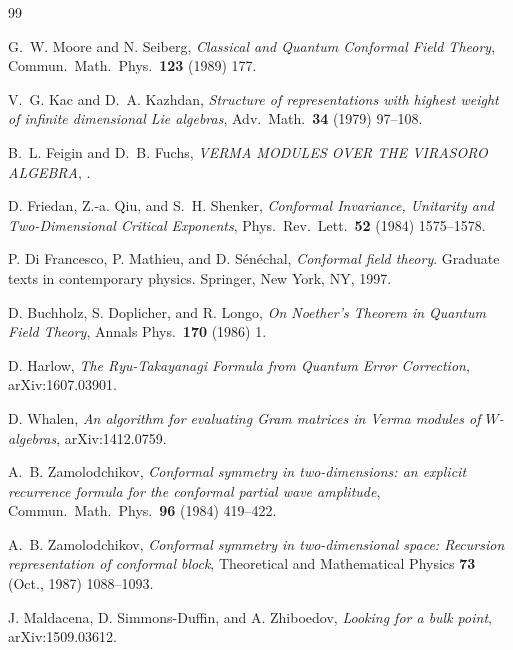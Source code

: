 
\begin{thebibliography}{99}

 G.~W. Moore and N. Seiberg, \emph{Classical and Quantum Conformal Field Theory}, Commun.\ Math.\ Phys.\ \textbf{123} (1989) 177.

 V.~G. Kac and D.~A. Kazhdan, \emph{Structure of representations with highest weight of infinite dimensional Lie algebras}, Adv.\ Math.\ \textbf{34} (1979) 97--108.

 B.~L. Feigin and D.~B. Fuchs, \emph{VERMA MODULES OVER THE VIRASORO ALGEBRA}, .

 D. Friedan, Z.-a. Qiu, and S.~H. Shenker, \emph{Conformal Invariance, Unitarity and Two-Dimensional Critical Exponents}, Phys.\ Rev.\ Lett.\ \textbf{52} (1984) 1575--1578.

 P. Di Francesco, P. Mathieu, and D. S\'en\'echal, \emph{Conformal field theory}. Graduate texts in contemporary physics. Springer, New York, NY, 1997.

 D. Buchholz, S. Doplicher, and R. Longo, \emph{On Noether's Theorem in Quantum Field Theory}, Annals Phys.\ \textbf{170} (1986) 1.

 D. Harlow, \emph{The Ryu-Takayanagi Formula from Quantum Error Correction}, arXiv:1607.03901.

 D. Whalen, \emph{An algorithm for evaluating Gram matrices in Verma modules of $W$-algebras}, arXiv:1412.0759.

 A.~B. Zamolodchikov, \emph{Conformal symmetry in two-dimensions: an explicit recurrence formula for the conformal partial wave amplitude}, Commun.\ Math.\ Phys.\ \textbf{96} (1984) 419--422.

 A.~B. Zamolodchikov, \emph{Conformal symmetry in two-dimensional space: Recursion representation of conformal block}, Theoretical and Mathematical Physics \textbf{73} (Oct., 1987) 1088--1093.

 J. Maldacena, D. Simmons-Duffin, and A. Zhiboedov, \emph{Looking for a bulk point}, arXiv:1509.03612.


\end{thebibliography}
